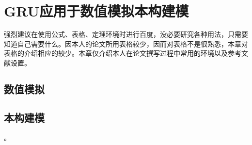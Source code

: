 \chapter{GRU应用于数值模拟本构建模}
强烈建议在使用公式、表格、定理环境时进行百度，没必要研究各种用法，只需要知道自己需要什么。因本人的论文所用表格较少，因而对表格不是很熟悉，本章对表格的介绍相应的较少。本章仅介绍本人在论文撰写过程中常用的环境以及参考文献设置。
\section{数值模拟}
\section{本构建模}
。
















